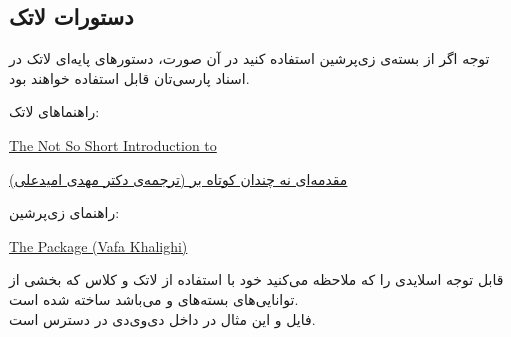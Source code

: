 \subsection{دستورات لاتک}
\begin{plainslide}
\begin{block}{توجه}
اگر از بسته‌ی زی‌پرشین استفاده کنید  در آن صورت، دستورهای پایه‌ای لاتک در اسناد پارسی‌تان قابل استفاده خواهند بود.
\end{block}
راهنماهای لاتک:
\begin{latin}
\href{resources/lshort-english.pdf}{The Not So Short Introduction to {\LaTeXe}}%
\end{latin}
\href{resources/lshort-persian.pdf}{مقدمه‌ای نه چندان کوتاه بر \lr{\LaTeXe}  (ترجمه‌ی دکتر مهدی امیدعلی)}

%
راهنمای زی‌پرشین:
\begin{latin}
\href{resources/xepersian.pdf}{The \XePersian{} Package (Vafa Khalighi)}
\end{latin}

\end{plainslide}

\label{Sec:Samples}
\begin{plainslide}[مثال‌ها]
\begin{alertblock}{قابل توجه}
\Large
اسلایدی را که ملاحظه می‌کنید خود با استفاده از لاتک و کلاس  که بخشی از توانایی‌های بسته‌های  و  می‌باشد ساخته شده است.\\
فایل  و   این مثال در داخل دی‌وی‌دی در دسترس است.
\end{alertblock}
\end{plainslide}
